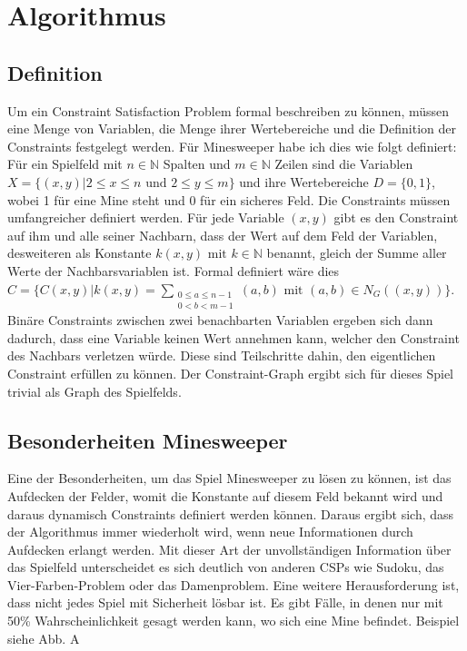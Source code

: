 %

\section{Algorithmus}

\subsection*{Definition}
Um ein Constraint Satisfaction Problem formal beschreiben zu können, müssen eine Menge von Variablen, die Menge 
ihrer Wertebereiche und die Definition der Constraints festgelegt werden. Für Minesweeper habe ich dies wie folgt definiert:
Für ein Spielfeld mit $n\in \mathbb{N}$ Spalten und $m\in\mathbb{N}$ Zeilen sind
die Variablen $X=\{(x, y) | 2\le x\le n  \text{ und }  2\le y\le m\}$ und ihre Wertebereiche $D=\{0, 1\}$, wobei 1
für eine Mine steht und 0 für ein sicheres Feld.
Die Constraints müssen umfangreicher definiert werden. Für jede Variable $(x, y)$ gibt es den Constraint auf ihm und alle seiner 
Nachbarn, dass der Wert auf dem Feld der Variablen, desweiteren als Konstante $k(x, y) \text{ mit } k\in\mathbb{N}$ 
benannt, gleich der Summe aller Werte der Nachbarsvariablen ist. Formal definiert wäre dies
$C=\{C(x, y) | k(x, y) = \sum_{\substack{0\le a\le n-1\\0<b<m-1}}{(a, b)} \text{ mit } (a, b)\in N_G((x, y))\}$.
Binäre Constraints zwischen zwei benachbarten Variablen ergeben sich dann dadurch, dass eine Variable keinen Wert annehmen kann, 
welcher den Constraint des Nachbars verletzen würde. Diese sind Teilschritte dahin, den eigentlichen Constraint erfüllen zu können.
Der Constraint-Graph ergibt sich für dieses Spiel trivial als Graph des Spielfelds.

\subsection*{Besonderheiten Minesweeper}
Eine der Besonderheiten, um das Spiel Minesweeper zu lösen zu können, ist das Aufdecken der Felder, womit die Konstante auf diesem Feld
bekannt wird und daraus dynamisch Constraints definiert werden können. Daraus ergibt sich, dass der Algorithmus immer wiederholt wird,
wenn neue Informationen durch Aufdecken erlangt werden. Mit dieser Art der unvollständigen Information über das Spielfeld unterscheidet es
sich deutlich von anderen CSPs wie Sudoku, das Vier-Farben-Problem oder das Damenproblem.
Eine weitere Herausforderung ist, dass nicht jedes Spiel mit Sicherheit lösbar ist. Es gibt Fälle, in denen nur mit 50\% Wahrscheinlichkeit
gesagt werden kann, wo sich eine Mine befindet. Beispiel siehe Abb. A

